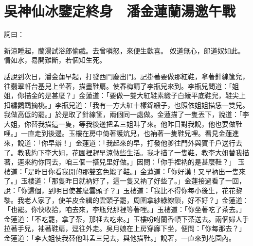 %

\chapter{吳神仙冰鑒定終身　潘金蓮蘭湯邀午戰}


\begin{showcontents}{}

詞曰：

新涼睡起，蘭湯試浴郎偷戲。去曾嗔怒，來便生歡喜。
奴道無心，郎道奴如此。情如水，易開難斷，若個知生死。

話說到次日，潘金蓮早起，打發西門慶出門。記掛著要做那紅鞋，拿著針線筐兒，往翡翠軒台基兒上坐著，描畫鞋扇。使春梅請了李瓶兒來到。李瓶兒問道：「姐姐，你描金的是甚麼？」金蓮道：「要做一雙大紅鞋素緞子白綾平底鞋兒，鞋尖上扣繡鸚鵡摘桃。」李瓶兒道：「我有一方大紅十樣錦緞子，也照依姐姐描恁一雙兒。我做高低的罷。」於是取了針線筐，兩個同一處做。金蓮描了一隻丟下，說道：「李大姐，你替我描這一隻，等我後邊把孟三姐叫了來。他昨日對我說，他也要做鞋哩。」一直走到後邊。玉樓在房中倚著護炕兒，也衲著一隻鞋兒哩。看見金蓮進來，說道：「你早辦！」金蓮道：「我起來的早，打發他爹往門外與賀千戶送行去了。教我約下李大姐，花園裡趕早涼做些生活。我才描了一隻鞋，教李大姐替我描著，逕來約你同去，咱三個一搭兒里好做。」因問：「你手裡衲的是甚麼鞋？」 玉樓道：「是昨日你看我開的那雙玄色緞子鞋。」金蓮道：「你好漢！又早衲出一隻來了。」玉樓道：「那隻昨日就衲好了，這一隻又衲了好些了。」金蓮接過看了一回，說：「你這個，到明日使甚麼雲頭子？」玉樓道：「我比不得你每小後生，花花黎黎。我老人家了，使羊皮金緝的雲頭子罷，周圍拿紗綠線鎖，好不好？」金蓮道：「也罷。你快收拾，咱去來，李瓶兒那裡等著哩。」玉樓道：「你坐著吃了茶去。」金蓮道：「不吃罷，拿了茶，那裡去吃來。」玉樓吩咐蘭香頓下茶送去。兩個婦人手拉著手兒，袖著鞋扇，逕往外走。吳月娘在上房穿廊下坐，便問：「你每那去？」金蓮道：「李大姐使我替他叫孟三兒去，與他描鞋。」說著，一直來到花園內。




\end{showcontents}
